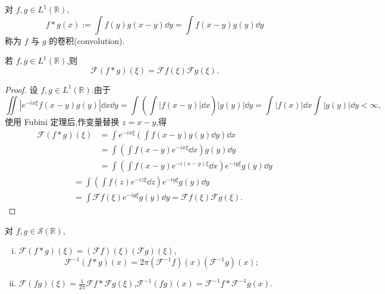 \begin{definition}\label{def:1.2.10}
对 $f, g \in L^{1}(\mathbb{R})$,
\begin{equation*}
f * g(x) := \int f(y)g(x - y)\dd y = \int f(x - y)g(y)\dd y
\end{equation*}
称为 $f$ 与 $g$ 的卷积(convolution).
\end{definition}

\begin{lemma}\label{lem:1.2.11}
若 $f, g \in L^{1}(\mathbb{R})$,则
\begin{equation*}
\mathcal{F}(f * g)(\xi) = \mathcal{F}f(\xi)\mathcal{F}g(\xi).
\end{equation*}
\end{lemma}

\begin{proof}
设 $f, g \in L^{1}(\mathbb{R})$.由于
\begin{equation*}
\iint |e^{-ix\xi}f(x - y)g(y)|\dd x\dd y = \int\left(\int |f(x - y)|\dd x\right)|g(y)|\dd y = \int |f(x)|\dd x\int |g(y)|\dd y < \infty,
\end{equation*}
使用 Fubini 定理后,作变量替换 $z = x - y$,得
\begin{align*}
\mathcal{F}(f * g)(\xi) & = \int e^{-ix\xi}\left(\int f(x - y)g(y)\dd y\right)\dd x \\
& = \int\left(\int f(x - y)e^{-ix\xi}\dd x\right)g(y)\dd y \\
& = \int\left(\int f(x - y)e^{-i(x-y)\xi}\dd x\right)e^{-iy\xi}g(y)\dd y
\end{align*}
\begin{align*}
&= \int\left(\int f(z)e^{-iz\xi}\dd z\right)e^{-iy\xi}g(y)\dd y \\
&= \int\mathcal{F}f(\xi)e^{-iy\xi}g(y)\dd y = \mathcal{F}f(\xi)\mathcal{F}g(\xi).
\end{align*}
\end{proof}

\begin{theorem}\label{thm:1.2.12}
对 $f, g \in \mathcal{S}(\mathbb{R})$,
\begin{enumerate}[(i)]
\item $\mathcal{F}(f * g)(\xi) = (\mathcal{F}f)(\xi)(\mathcal{F}g)(\xi)$,
\begin{equation*}
\mathcal{F}^{-1}(f * g)(x) = 2\pi(\mathcal{F}^{-1}f)(x)(\mathcal{F}^{-1}g)(x);
\end{equation*}
\item $\mathcal{F}(fg)(\xi) = \frac{1}{2\pi}\mathcal{F}f * \mathcal{F}g(\xi)$,$\mathcal{F}^{-1}(fg)(x) = \mathcal{F}^{-1}f * \mathcal{F}^{-1}g(x)$.
\end{enumerate}
\end{theorem}

